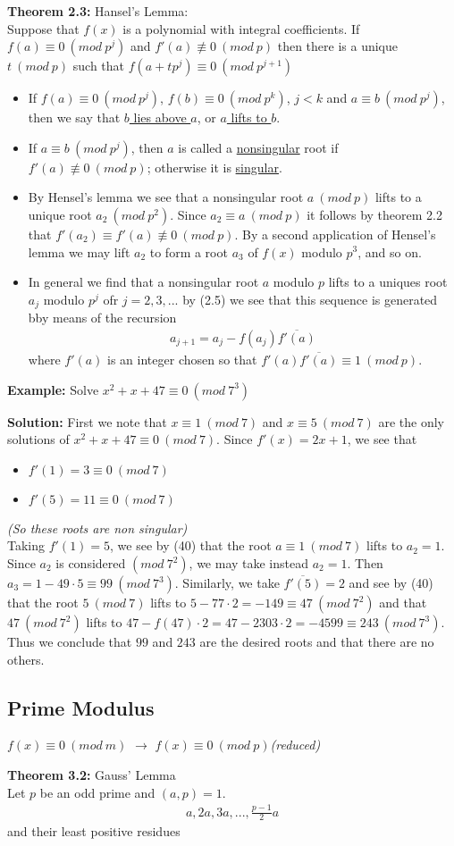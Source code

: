 \documentclass[a4paper]{article}
\begin{document}
\textbf{Theorem 2.3:} Hansel's Lemma:\\
Suppose that $f(x)$ is a polynomial with integral coefficients.
If $f(a)\equiv0\ (mod\ p^j)$ and $f'(a)\not\equiv0\ (mod\ p)$ then there is
a unique $t\ (mod\ p)$ such that $f(a+tp^j)\equiv0\ (mod\ p^{j+1})$

\begin{itemize}
    \item If $f(a)\equiv0\ (mod\ p^j)$, $f(b)\equiv 0\ (mod\ p^k)$, $j<k$ and
    $a\equiv b\ (mod\ p^j)$, then we say that \underline{$b$ lies above $a$}, or
    \underline{$a$ lifts to $b$}.
    \item If $a\equiv b\ (mod\ p^j)$, then $a$ is called a \underline{nonsingular}
    root if $f'(a)\not\equiv 0\ (mod\ p)$; otherwise it is \underline{singular}.
    \item By Hensel's lemma we see that a nonsingular root $a\ (mod\ p)$ lifts
    to a unique root $a_2\ (mod\ p^2)$. Since $a_2\equiv a\ (mod\ p)$ it follows
    by theorem 2.2 that $f'(a_2)\equiv f'(a)\not\equiv 0\ (mod\ p)$. By a second
    application of Hensel's lemma we may lift $a_2$ to form a root $a_3$ of $f(x)$
    modulo $p^3$, and so on.
    \item In general we find that a nonsingular root $a$ modulo $p$ lifts to a
    uniques root $a_j$ modulo $p^j$ ofr $j=2,3,...$ by (2.5) we see that this
    sequence is generated bby means of the recursion
    \begin{align}
        a_{j+1} = a_j-f(a_j)\overline{f'(a)}
    \end{align}
    where $f'(a)$ is an integer chosen so that
    $f'(a)\overline{f'(a)}\equiv 1\ (mod\ p)$.
\end{itemize}

\textbf{Example:}
Solve $x^2+x+47\equiv 0\ (mod\ 7^3)$

\textbf{Solution:}
First we note that $x\equiv 1\ (mod\ 7)$ and $x\equiv 5\ (mod\ 7)$ are the only
solutions of $x^2+x+47\equiv 0\ (mod\ 7)$. Since $f'(x)=2x+1$, we see that
\begin{itemize}
    \item $f'(1)=3\equiv 0\ (mod\ 7)$
    \item $f'(5)=11\equiv 0\ (mod\ 7)$
\end{itemize}
\textit{(So these roots are non singular)}\\
Taking $f'(1)=5$, we see by (40) that the root $a\equiv 1\ (mod\ 7)$ lifts to
$a_2=1$. Since $a_2$ is considered $(mod\ 7^2)$, we may take instead $a_2=1$.
Then $a_3=1-49\cdot5\equiv 99\ (mod\ 7^3)$. Similarly, we take $\overline{f'(5)}=2$
and see by (40) that the root $5\ (mod\ 7)$ lifts to
$5-77\cdot2=-149\equiv 47\ (mod\ 7^2)$ and that $47\ (mod\ 7^2)$ lifts to
$47-f(47)\cdot2=47-2303\cdot2=-4599\equiv 243\ (mod\ 7^3)$.
Thus we conclude that $99$ and $243$ are the desired roots and that there are
no others.


\subsection{Prime Modulus}

$f(x)\equiv 0\ (mod\ m)$ $\to$ $f(x)\equiv 0\ (mod\ p)$\quad  \textit{(reduced)}

\textbf{Theorem 3.2:} Gauss' Lemma\\
Let $p$ be an odd prime and $(a,p)=1$.
\begin{align}
    a,2a,3a,...,\frac{p-1}{2}a
\end{align}
and their least positive residues
\end{document}
